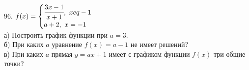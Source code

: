 96. $f(x)=\begin{cases} \cfrac{3x-1}{x+1},\ x
eq-1\\a+2,\ x=-1 \end{cases}$\\
а) Построить график функции при $a=3.$\\
б) При каких $a$ уравнение $f(x)=a-1$ не имеет решений?\\
в) При каких $a$ прямая $y=ax+1$ имеет с графиком функции $f(x)$ три общие точки?\\
